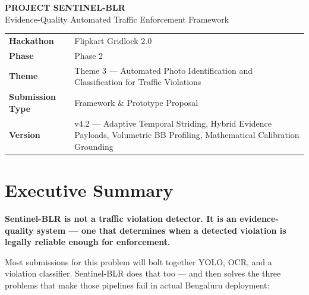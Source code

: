\documentclass[11pt,a4paper]{article}
\begin{document}
\begin{center}
    {\Huge\bfseries\color{sentinelblue} PROJECT SENTINEL-BLR}\\[0.5em]
    {\large\color{gray} Evidence-Quality Automated Traffic Enforcement Framework}\\[1.2em]

    \begin{tabular}{L{3.5cm} L{11cm}}
        \toprule
        \\
        \midrule
        \textbf{Hackathon}    & Flipkart Gridlock 2.0 \\
        \textbf{Phase}        & Phase 2 \\
        \textbf{Theme}        & Theme 3 — Automated Photo Identification and Classification for Traffic Violations \\
        \textbf{Submission Type} & Framework \& Prototype Proposal \\
        \textbf{Version}      & v4.2 — Adaptive Temporal Striding, Hybrid Evidence Payloads, Volumetric BB Profiling, Mathematical Calibration Grounding \\
        \bottomrule
    \end{tabular}
\end{center}

\vspace{1em}

\section{Executive Summary}

\textbf{Sentinel-BLR is not a traffic violation detector. It is an evidence-quality system — one that determines when a detected violation is legally reliable enough for enforcement.}

Most submissions for this problem will bolt together YOLO, OCR, and a violation classifier. Sentinel-BLR does that too — and then solves the three problems that make those pipelines fail in actual Bengaluru deployment:
\end{document}
